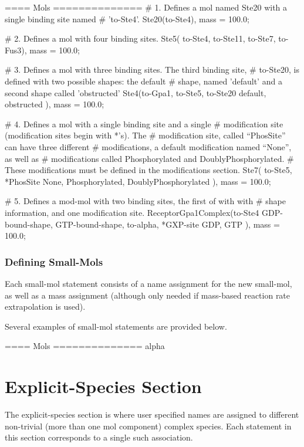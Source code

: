 \begin{ExampleXML}[label=examplemodmolssec]
==== Mols ==============
    # 1. Defines a mol named Ste20 with a single binding site named
    # 'to-Ste4'. 
    Ste20(to-Ste4),
        mass = 100.0;

    # 2. Defines a mol with four binding sites.
    Ste5( to-Ste4, to-Ste11, to-Ste7, to-Fus3),
         mass = 100.0;

    # 3. Defines a mol with three binding sites.  The third binding site,
    # to-Ste20, is defined with two possible shapes: the default
    # shape, named 'default' and a second shape called 'obstructed'
    Ste4(to-Gpa1, to-Ste5, to-Ste20 { default, obstructed} ),
         mass = 100.0;

    # 4. Defines a mol with a single binding site and a single
    # modification site (modification sites begin with *'s). The
    # modification site, called ``PhosSite'' can have three different
    # modifications, a default modification named ``None'', as well as
    # modifications called Phosphorylated and DoublyPhosphorylated.
    # These modifications must be defined in the modifications section.
    Ste7( to-Ste5, *PhosSite { None, Phosphorylated, DoublyPhosphorylated } ),
         mass = 100.0;

    # 5. Defines a mod-mol with two binding sites, the first of with with
    # shape information, and one modification site.
    ReceptorGpa1Complex(to-Ste4 { GDP-bound-shape, GTP-bound-shape},  to-alpha, *GXP-site { GDP, GTP} ), 
   	mass = 100.0;
\end{ExampleXML}


\subsubsection{Defining Small-Mols}
Each small-mol statement consists of a name assignment for the new
small-mol, as well as a mass assignment (although only needed if
mass-based reaction rate extrapolation is used).  

Several examples of small-mol statements are provided below.  
\begin{ExampleXML}
  ==== Mols ==============
     alpha

\end{ExampleXML}

\section{Explicit-Species Section}
The explicit-species section is where user specified names are
assigned to different non-trivial (more than one mol component)
complex species.  Each statement in this section corresponds to a
single such association.


